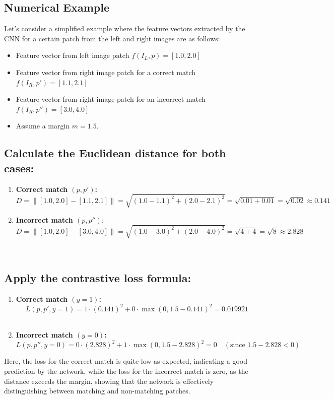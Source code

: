 \documentclass[22pt]{report}
\begin{document}
\subsection*{Numerical Example}
Let's consider a simplified example where the feature vectors extracted by the CNN for a certain patch from the left and right images are as follows:
\begin{itemize}
    \item Feature vector from left image patch \( f(I_L, p) = [1.0, 2.0] \)
    \item Feature vector from right image patch for a correct match \( f(I_R, p') = [1.1, 2.1] \)
    \item Feature vector from right image patch for an incorrect match \( f(I_R, p'') = [3.0, 4.0] \)
    \item Assume a margin \( m = 1.5 \).
\end{itemize}
\vspace{10}
\subsection*{Calculate the Euclidean distance for both cases:}
\begin{enumerate}
    \item \textbf{Correct match \( (p, p') \):} \\
            \[
            D = \| [1.0, 2.0] - [1.1, 2.1] \| = \sqrt{(1.0 - 1.1)^2 + (2.0 - 2.1)^2} = \sqrt{0.01 + 0.01} = \sqrt{0.02} \approx 0.141
            \]
    \item \textbf{Incorrect match \( (p, p'') \)}:\\
            \[
            D = \| [1.0, 2.0] - [3.0, 4.0] \| = \sqrt{(1.0 - 3.0)^2 + (2.0 - 4.0)^2} = \sqrt{4 + 4} = \sqrt{8} \approx 2.828
            \]
\end{enumerate}
\\
\subsection*{Apply the contrastive loss formula:}
\begin{enumerate}
    \item \textbf{Correct match \( (y = 1) \):} \\
         \[
            L(p, p', y = 1) = 1 \cdot (0.141)^2 + 0 \cdot \max(0, 1.5 - 0.141)^2 = 0.019921
            \]
            \\
     \item \textbf{Incorrect match \( (y = 0) \):}\\
            \[
            L(p, p'', y = 0) = 0 \cdot (2.828)^2 + 1 \cdot \max(0, 1.5 - 2.828)^2 = 0 \quad (\text{since } 1.5 - 2.828 < 0)
            \]
\end{enumerate}
\vspace{8}
Here, the loss for the correct match is quite low as expected, indicating a good prediction by the network, while the loss for the incorrect match is zero, as the distance exceeds the margin, showing that the network is effectively distinguishing between matching and non-matching patches.
\end{document}
